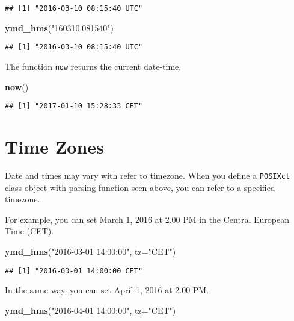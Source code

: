 \documentclass[]{book}
\newenvironment{Shaded}{\begin{snugshade}}{\end{snugshade}}
\newcommand{\KeywordTok}[1]{\textcolor[rgb]{0.13,0.29,0.53}{\textbf{{#1}}}}
\newcommand{\DataTypeTok}[1]{\textcolor[rgb]{0.13,0.29,0.53}{{#1}}}
\newcommand{\StringTok}[1]{\textcolor[rgb]{0.31,0.60,0.02}{{#1}}}
\newcommand{\NormalTok}[1]{{#1}}
\begin{document}
\begin{verbatim}
## [1] "2016-03-10 08:15:40 UTC"
\end{verbatim}

\begin{Shaded}
\begin{Highlighting}[]
\KeywordTok{ymd_hms}\NormalTok{(}\StringTok{"160310:081540"}\NormalTok{)}
\end{Highlighting}
\end{Shaded}

\begin{verbatim}
## [1] "2016-03-10 08:15:40 UTC"
\end{verbatim}

The function \texttt{now} returns the current date-time.

\begin{Shaded}
\begin{Highlighting}[]
\KeywordTok{now}\NormalTok{()}
\end{Highlighting}
\end{Shaded}

\begin{verbatim}
## [1] "2017-01-10 15:28:33 CET"
\end{verbatim}

\section{Time Zones}\label{time-zones}

Date and times may vary with refer to timezone. When you define a
\texttt{POSIXct} class object with parsing function seen above, you can
refer to a specified timezone.

For example, you can set March 1, 2016 at 2.00 PM in the Central
European Time (CET).

\begin{Shaded}
\begin{Highlighting}[]
\KeywordTok{ymd_hms}\NormalTok{(}\StringTok{"2016-03-01 14:00:00"}\NormalTok{, }\DataTypeTok{tz=}\StringTok{"CET"}\NormalTok{)}
\end{Highlighting}
\end{Shaded}

\begin{verbatim}
## [1] "2016-03-01 14:00:00 CET"
\end{verbatim}

In the same way, you can set April 1, 2016 at 2.00 PM.

\begin{Shaded}
\begin{Highlighting}[]
\KeywordTok{ymd_hms}\NormalTok{(}\StringTok{"2016-04-01 14:00:00"}\NormalTok{, }\DataTypeTok{tz=}\StringTok{"CET"}\NormalTok{)}
\end{Highlighting}
\end{Shaded}
\end{document}
